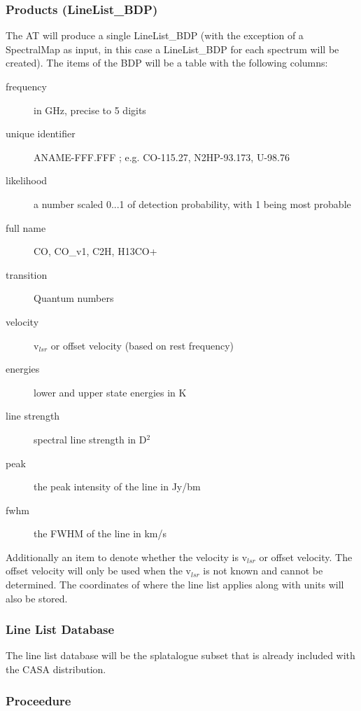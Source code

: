 \subsubsection{Products (LineList\_BDP)}
The AT will produce a single LineList\_BDP (with the exception of a SpectralMap as input, in this case a LineList\_BDP for each spectrum will be created). The items of the BDP will be a table with the following columns:
\begin{description}
\item[frequency] in GHz, precise to 5 digits
\item[unique identifier] ANAME-FFF.FFF ; e.g.  CO-115.27,   N2HP-93.173,   U-98.76
\item[likelihood] a number scaled 0...1 of detection probability, with 1 being most probable
\item[full name] CO, CO\_v1, C2H, H13CO+
\item[transition] Quantum numbers
\item[velocity] v$_{lsr}$ or offset velocity (based on rest frequency)
\item[energies] lower and upper state energies in K
\item[line strength] spectral line strength in D$^2$
\item[peak] the peak intensity of the line in Jy/bm
\item[fwhm] the FWHM of the line in km/s
\end{description}
Additionally an item to denote whether the velocity is v$_{lsr}$ or offset velocity. The offset velocity will only be used when the v$_{lsr}$ is not known and cannot be determined. The coordinates of where the line list applies along with units will also be stored.

\subsubsection{Line List Database}
The line list database will be the splatalogue subset that is already included with the CASA distribution.
\subsubsection{Proceedure}
\clearpage
